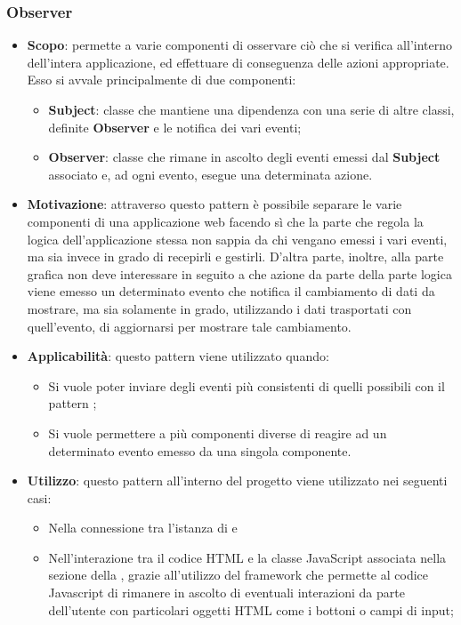 \subsubsection{Observer}
\begin{itemize}
	\item \textbf{Scopo}: permette a varie componenti di osservare ciò che si verifica all'interno dell'intera applicazione, ed effettuare di conseguenza delle azioni appropriate. Esso si avvale principalmente di due componenti: 
		  \begin{itemize}
		  	 	\item \textbf{Subject}: classe che mantiene una dipendenza con una serie di altre classi, definite \textbf{Observer} e le notifica dei vari eventi; 
		  	 	\item \textbf{Observer}: classe che rimane in ascolto degli eventi emessi dal \textbf{Subject} associato e, ad ogni evento, esegue una determinata azione.
		  \end{itemize}
	\item \textbf{Motivazione}: attraverso questo pattern è possibile separare le varie componenti di una applicazione web facendo sì che la parte che regola la logica dell'applicazione stessa non sappia da chi vengano emessi i vari eventi, ma sia invece in grado di recepirli e gestirli. D'altra parte, inoltre, alla parte grafica non deve interessare in seguito a che azione da parte della parte logica viene emesso un determinato evento che notifica il cambiamento di dati da mostrare, ma sia solamente in grado, utilizzando i dati trasportati con quell'evento, di aggiornarsi per mostrare tale cambiamento.
	\item \textbf{Applicabilità}: questo pattern viene utilizzato quando:
		  \begin{itemize}
		  	 	\item Si vuole poter inviare degli eventi più consistenti di quelli possibili con il pattern ; 
		  	 	\item Si vuole permettere a più componenti diverse di reagire ad un determinato evento emesso da una singola componente.
		  \end{itemize}
	\item \textbf{Utilizzo}: questo pattern all'interno del progetto viene utilizzato nei seguenti casi:
		  \begin{itemize}
		  		\item Nella connessione tra l'istanza di  e \progettoShort\
		  		\item Nell'interazione tra il codice HTML e la classe JavaScript associata nella sezione della , grazie all'utilizzo del framework  che permette al codice Javascript di rimanere in ascolto di eventuali interazioni da parte dell'utente con particolari oggetti HTML come i bottoni o campi di input;

\end{itemize}
\end{itemize}
